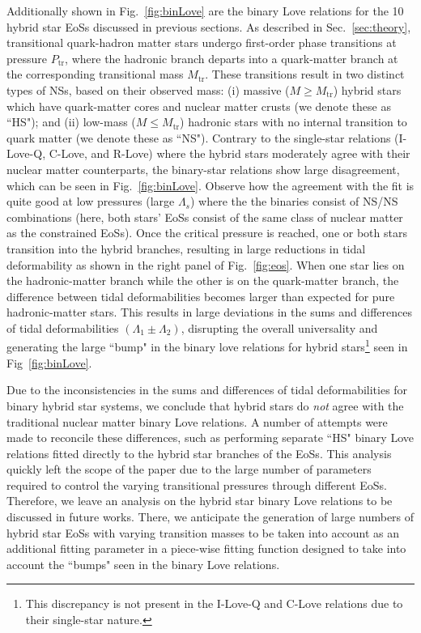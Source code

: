 \documentclass[prd,twocolumn,nofootinbib,superscriptaddress,amsmath,amssymb]{revtex4-1}
\begin{document}
Additionally shown in Fig.~\ref{fig:binLove} are the binary Love relations for the 10 hybrid star EoSs discussed in previous sections.
As described in Sec.~\ref{sec:theory}, transitional quark-hadron matter stars undergo first-order phase transitions at pressure $P_{\text{tr}}$, where the hadronic branch departs into a quark-matter branch at the corresponding transitional mass $M_{\text{tr}}$.
These transitions result in two distinct types of NSs, based on their observed mass: (i) massive ($M \geq M_{\text{tr}}$) hybrid stars which have quark-matter cores and nuclear matter crusts (we denote these as ``HS"); and (ii) low-mass ($M \leq M_{\text{tr}}$) hadronic stars with no internal transition to quark matter (we denote these as ``NS").
Contrary to the single-star relations (I-Love-Q, C-Love, and R-Love) where the hybrid stars moderately agree with their nuclear matter counterparts, the binary-star relations show large disagreement, which can be seen in Fig.~\ref{fig:binLove}.
Observe how the agreement with the fit is quite good at low pressures (large $\Lambda_s$) where the the binaries consist of NS/NS combinations (here, both stars' EoSs consist of the same class of nuclear matter as the constrained EoSs).
Once the critical pressure is reached, one or both stars transition into the hybrid branches, resulting in large reductions in tidal deformability as shown in the right panel of Fig.~\ref{fig:eos}.
When one star lies on the hadronic-matter branch while the other is on the quark-matter branch, 
the difference between tidal deformabilities becomes larger than expected for pure hadronic-matter stars.
This results in large deviations in the sums and differences of tidal deformabilities $(\Lambda_1 \pm \Lambda_2)$, disrupting the overall universality and generating the large ``bump" in the binary love relations for hybrid stars\footnote{This discrepancy is not present in the I-Love-Q and C-Love relations due to their single-star nature.} seen in Fig~\ref{fig:binLove}.

Due to the inconsistencies in the sums and differences of tidal deformabilities for binary hybrid star systems, we conclude that hybrid stars do \emph{not} agree with the traditional nuclear matter binary Love relations.
A number of attempts were made to reconcile these differences, such as performing separate ``HS" binary Love relations fitted directly to the hybrid star branches of the EoSs.
This analysis quickly left the scope of the paper due to the large number of parameters required to control the varying transitional pressures through different EoSs.
Therefore, we leave an analysis on the hybrid star binary Love relations to be discussed in future works.
There, we anticipate the generation of large numbers of hybrid star EoSs with varying transition masses to be taken into account as an additional fitting parameter in a piece-wise fitting function designed to take into account the ``bumps" seen in the binary Love relations.
\end{document}
